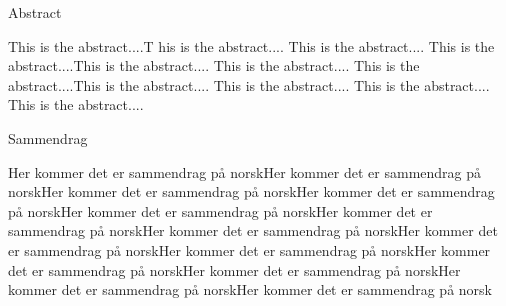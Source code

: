 
{\centering 

	{\Huge Abstract}

	\vspace{1cm}

	This is the abstract....T his is the abstract.... This is the abstract.... This is the abstract....This is the abstract.... This is the abstract.... This is the abstract....This is the abstract.... This is the abstract.... This is the abstract.... This is the abstract....

}

\clearpage


{\centering 

	{\Huge Sammendrag}

	\vspace{1cm}

	Her kommer det er sammendrag på norskHer kommer det er sammendrag på norskHer kommer det er sammendrag på norskHer kommer det er sammendrag på norskHer kommer det er sammendrag på norskHer kommer det er sammendrag på norskHer kommer det er sammendrag på norskHer kommer det er sammendrag på norskHer kommer det er sammendrag på norskHer kommer det er sammendrag på norskHer kommer det er sammendrag på norskHer kommer det er sammendrag på norskHer kommer det er sammendrag på norsk
	
}

	

